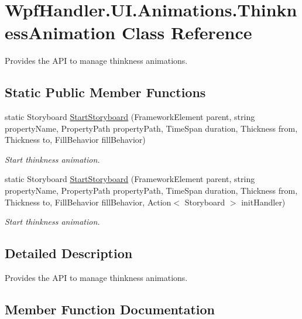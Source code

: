 \hypertarget{class_wpf_handler_1_1_u_i_1_1_animations_1_1_thinkness_animation}{}\section{Wpf\+Handler.\+U\+I.\+Animations.\+Thinkness\+Animation Class Reference}
\label{class_wpf_handler_1_1_u_i_1_1_animations_1_1_thinkness_animation}


Provides the A\+PI to manage thinkness animations.  


\subsection*{Static Public Member Functions}
\begin{DoxyCompactItemize}
\item 
static Storyboard \mbox{\hyperlink{class_wpf_handler_1_1_u_i_1_1_animations_1_1_thinkness_animation_ac4a710434bb02a390f075779861718c3}{Start\+Storyboard}} (Framework\+Element parent, string property\+Name, Property\+Path property\+Path, Time\+Span duration, Thickness from, Thickness to, Fill\+Behavior fill\+Behavior)
\begin{DoxyCompactList}\small\item\em Start thinkness animation. \end{DoxyCompactList}\item 
static Storyboard \mbox{\hyperlink{class_wpf_handler_1_1_u_i_1_1_animations_1_1_thinkness_animation_a8d77a8dc5e24b4d00e9aa123a4ca7831}{Start\+Storyboard}} (Framework\+Element parent, string property\+Name, Property\+Path property\+Path, Time\+Span duration, Thickness from, Thickness to, Fill\+Behavior fill\+Behavior, Action$<$ Storyboard $>$ init\+Handler)
\begin{DoxyCompactList}\small\item\em Start thinkness animation. \end{DoxyCompactList}\end{DoxyCompactItemize}


\subsection{Detailed Description}
Provides the A\+PI to manage thinkness animations. 



\subsection{Member Function Documentation}
\mbox{\label{class_wpf_handler_1_1_u_i_1_1_animations_1_1_thinkness_animation_ac4a710434bb02a390f075779861718c3}} 
